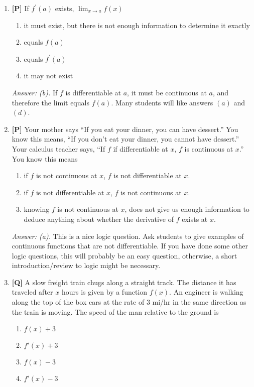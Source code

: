 \documentclass[12pt]{article}
\begin{document}
\begin{enumerate}
{\it Answer: (a).} Instructors should encourage the use of the limit definition of derivative; $f^{\prime}(0)=0$

\bigskip

\item {\bf [P]} If $f^{\prime}(a)$ exists, $\displaystyle{\lim_{x\rightarrow a}f(x)}$
\begin{enumerate}
\item it must exist, but there is not enough information to determine it exactly
\item equals $f(a)$
\item equals $f^{\prime}(a)$
\item it may not exist
\end{enumerate}

{\it Answer: (b).} If $f$ is differentiable at $a$, it must be continuous at $a$, and therefore the limit equals $f(a)$. Many students will like answers $(a)$ and $(d)$.

\bigskip

\item {\bf [P]} Your mother says ``If you eat your dinner, you can have
dessert.''  You know this means, ``If you don't eat your dinner, you
cannot have dessert.''  Your calculus teacher says, ``If $f$ if
differentiable at $x$, $f$ is continuous at $x$.''  You know this
means 
\begin{enumerate}
\item if $f$ is not continuous at $x$, $f$ is not differentiable at
$x$.
\item if $f$ is not differentiable at $x$, $f$ is not continuous at
$x$.
\item knowing $f$ is not continuous at $x$, does not give us enough 
information to deduce anything about whether the derivative of $f$
exists at $x$.
\end{enumerate}

{\it Answer: (a).} This is a nice logic question. Ask students to give examples 
of continuous functions that are not differentiable. If you have done some other 
logic questions, this will probably be an easy question, otherwise, a short 
introduction/review to logic might be necessary.

\bigskip

\item {\bf [Q]} A slow freight train chugs along a straight track.  The distance
it has traveled after $x$ hours is given by a function $f(x)$.  
An engineer is walking along the top of the box cars at the rate of 
$3$ mi/hr in the same direction as the train is moving.
The speed of the man relative to the ground is 
\begin{enumerate}
\item $f(x)+3$
\item $f'(x)+3$
\item $f(x)-3$
\item $f'(x)-3$
\end{enumerate}


\end{enumerate}
\end{document}
